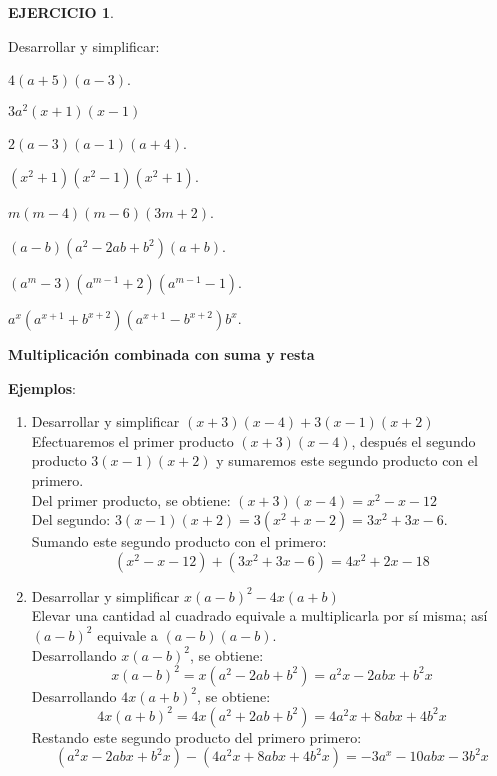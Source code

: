 \documentclass[12pt,letterpaper]{article}
\theoremstyle{definition}
\newtheorem{ejer}{EJERCICIO}
\begin{document}
\vspace{1mm}

\begin{ejer}\

Desarrollar y simplificar: %
\begin{enumerate}
\begin{multicols}{2}
\item $4(a+5)(a-3)$.
\item $3a^2(x+1)(x-1)$
\item $2(a-3)(a-1)(a+4)$.
\item $(x^2+1)(x^2-1)(x^2+1)$.
\item $m(m-4)(m-6)(3m+2)$.
\item $(a-b)(a^2-2ab+b^2)(a+b)$.
\item $(a^m-3)(a^{m-1}+2)(a^{m-1}-1)$. %
\item $a^x(a^{x+1}+b^{x+2})(a^{x+1}-b^{x+2})b^x$. %
\end{multicols}
\end{enumerate}
\end{ejer}

\pagebreak


\textbf{Multiplicación combinada con suma y resta} %

\textbf{Ejemplos}:

\begin{enumerate}
\item Desarrollar y simplificar $(x+3)(x-4)+3(x-1)(x+2)$\\
Efectuaremos el primer producto $(x+3)(x-4)$, después el segundo producto $3(x-1)(x+2)$ y sumaremos este segundo producto con el primero.\\
Del primer producto, se obtiene: $(x+3)(x-4)=x^2-x-12$\\
Del segundo: $3(x-1)(x+2)=3(x^2+x-2)=3x^2+3x-6$.\\
Sumando este segundo producto con el primero:
\begin{equation*}
(x^2-x-12)+(3x^2+3x-6)=4x^2+2x-18
\end{equation*}
\item Desarrollar y simplificar $x(a-b)^2-4x(a+b)$\\
Elevar una cantidad al cuadrado equivale a multiplicarla por sí misma; así $(a-b)^2$ equivale a $(a-b)(a-b)$.\\
Desarrollando $x(a-b)^2$, se obtiene:
\begin{equation*}
x(a-b)^2=x(a^2-2ab+b^2)=a^2x-2abx+b^2x
\end{equation*}
Desarrollando $4x(a+b)^2$, se obtiene:
\begin{equation*}
4x(a+b)^2=4x(a^2+2ab+b^2)=4a^2x+8abx+4b^2x
\end{equation*}
Restando este segundo producto del primero primero:
\begin{equation*}
(a^2x-2abx+b^2x)-(4a^2x+8abx+4b^2x)=-3a^x-10abx-3b^2x
\end{equation*}
\end{enumerate}
\end{document}
